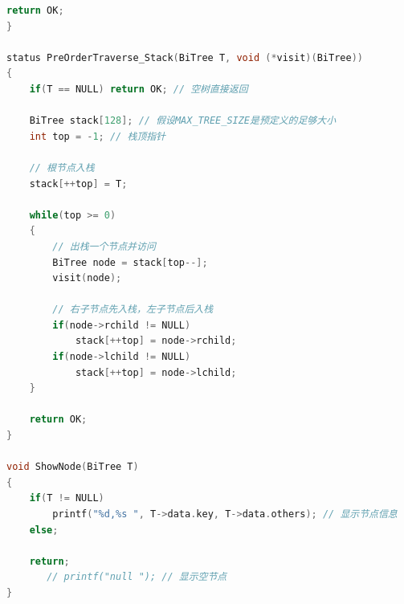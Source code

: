\documentclass[supercite]{Experimental_Report}
\theoremstyle{definition}
\begin{document}
\begin{lstlisting}[language=C, caption={BiTree-Traverse.h}, label=lst:bi_tree_traverse_h]
    return OK;
}

status PreOrderTraverse_Stack(BiTree T, void (*visit)(BiTree))
{
    if(T == NULL) return OK; // 空树直接返回
    
    BiTree stack[128]; // 假设MAX_TREE_SIZE是预定义的足够大小
    int top = -1; // 栈顶指针
    
    // 根节点入栈
    stack[++top] = T;
    
    while(top >= 0)
    {
        // 出栈一个节点并访问
        BiTree node = stack[top--];
        visit(node);
        
        // 右子节点先入栈，左子节点后入栈
        if(node->rchild != NULL)
            stack[++top] = node->rchild;
        if(node->lchild != NULL)
            stack[++top] = node->lchild;
    }
    
    return OK;
}

void ShowNode(BiTree T)
{
    if(T != NULL)
        printf("%d,%s ", T->data.key, T->data.others); // 显示节点信息
    else;

    return;
       // printf("null "); // 显示空节点
}
\end{lstlisting}
\end{document}
